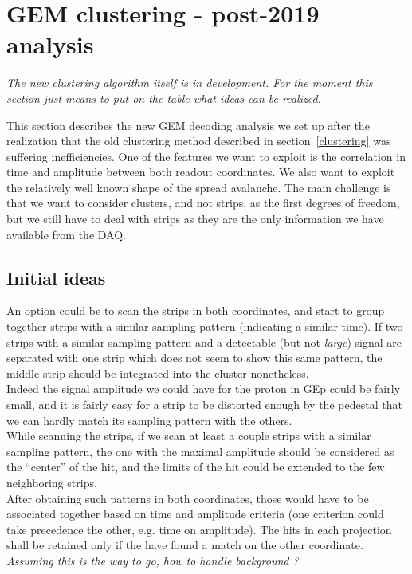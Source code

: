\section{GEM clustering - post-2019 analysis}
\label{clustering_new}

{\em The new clustering algorithm itself is in development. For the moment this section just means to put on the table what ideas can be realized.}

This section describes the new GEM decoding analysis we set up after the realization that the old clustering method described in section~\ref{clustering} was suffering inefficiencies.
One of the features we want to exploit is the correlation in time and amplitude between both readout coordinates. We also want to exploit the relatively well known shape of the spread avalanche.
The main challenge is that we want to consider clusters, and not strips, as the first degrees of freedom, but we still have to deal with strips as they are the only information we have available from the DAQ.

\subsection{Initial ideas}

An option could be to scan the strips in both coordinates, and start to group together strips with a similar sampling pattern (indicating a similar time). If two strips with a similar sampling pattern and a detectable (but not {\em large}) signal are separated with one strip which does not seem to show this same pattern, the middle strip should be integrated into the cluster nonetheless.\\
Indeed the signal amplitude we could have for the proton in GEp could be fairly small, and it is fairly easy for a strip to be distorted enough by the pedestal that we can hardly match its sampling pattern with the others.\\
While scanning the strips, if we scan at least a couple strips with a similar sampling pattern, the one with the maximal amplitude should be considered as the ``center'' of the hit, and the limits of the hit could be extended to the few neighboring strips.\\
After obtaining such patterns in both coordinates, those would have to be associated together based on time and amplitude criteria (one criterion could take precedence the other, e.g. time on amplitude). The hits in each projection shall be retained only if the have found a match on the other coordinate.
{\em Assuming this is the way to go, how to handle background ?}\\

